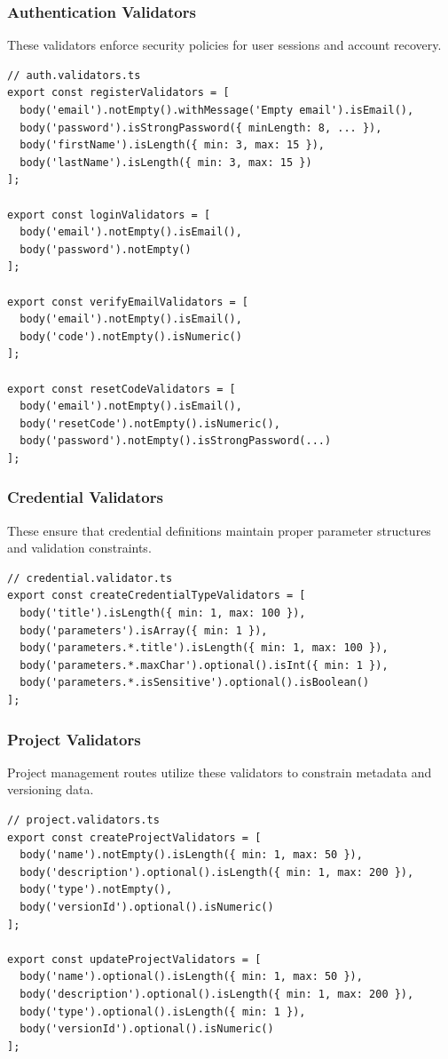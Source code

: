 \subsubsection{Authentication Validators}
These validators enforce security policies for user sessions and account recovery.
\begin{lstlisting}[caption={Authentication validation schemas}]
// auth.validators.ts
export const registerValidators = [
  body('email').notEmpty().withMessage('Empty email').isEmail(),
  body('password').isStrongPassword({ minLength: 8, ... }),
  body('firstName').isLength({ min: 3, max: 15 }),
  body('lastName').isLength({ min: 3, max: 15 })
];

export const loginValidators = [
  body('email').notEmpty().isEmail(),
  body('password').notEmpty()
];

export const verifyEmailValidators = [
  body('email').notEmpty().isEmail(),
  body('code').notEmpty().isNumeric()
];

export const resetCodeValidators = [
  body('email').notEmpty().isEmail(),
  body('resetCode').notEmpty().isNumeric(),
  body('password').notEmpty().isStrongPassword(...)
];
\end{lstlisting}

\subsubsection{Credential Validators}
These ensure that credential definitions maintain proper parameter structures and validation constraints.
\begin{lstlisting}[caption={Credential type validation schema}]
// credential.validator.ts
export const createCredentialTypeValidators = [
  body('title').isLength({ min: 1, max: 100 }),
  body('parameters').isArray({ min: 1 }),
  body('parameters.*.title').isLength({ min: 1, max: 100 }),
  body('parameters.*.maxChar').optional().isInt({ min: 1 }),
  body('parameters.*.isSensitive').optional().isBoolean()
];
\end{lstlisting}

\subsubsection{Project Validators}
Project management routes utilize these validators to constrain metadata and versioning data.
\begin{lstlisting}[caption={Project creation and update validation}]
// project.validators.ts
export const createProjectValidators = [
  body('name').notEmpty().isLength({ min: 1, max: 50 }),
  body('description').optional().isLength({ min: 1, max: 200 }),
  body('type').notEmpty(),
  body('versionId').optional().isNumeric()
];

export const updateProjectValidators = [
  body('name').optional().isLength({ min: 1, max: 50 }),
  body('description').optional().isLength({ min: 1, max: 200 }),
  body('type').optional().isLength({ min: 1 }),
  body('versionId').optional().isNumeric()
];
\end{lstlisting}

